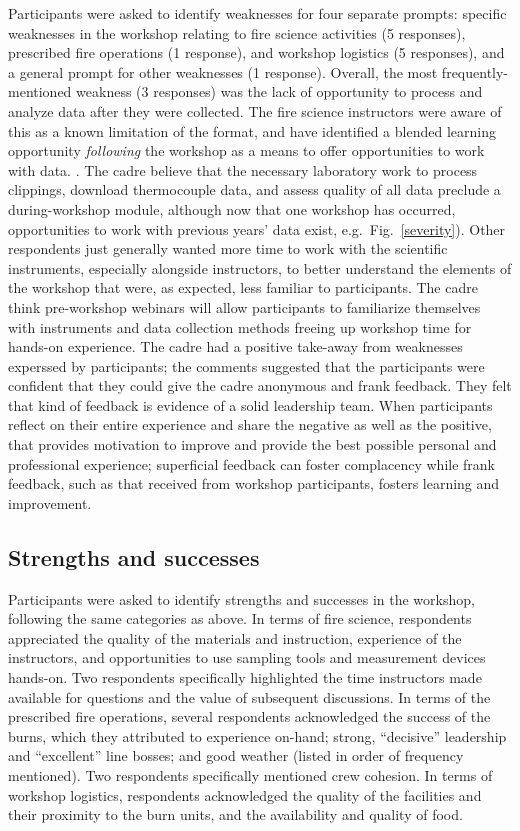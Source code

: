 \documentclass[fire,article,submit,moreauthors,pdftex]{Definitions/mdpi}
\begin{document}
Participants were asked to identify weaknesses for four separate prompts: specific weaknesses in the workshop relating to fire science activities (5 responses), prescribed fire operations (1 response), and workshop logistics (5 responses), and a general prompt for other weaknesses (1 response).
Overall, the most frequently-mentioned weakness (3 responses) was the lack of opportunity to process and analyze data after they were collected.
The fire science instructors were aware of this as a known limitation of the format, and have identified a blended learning opportunity \emph{following} the workshop as a means to offer opportunities to work with data.
. The cadre believe that the necessary laboratory work to process clippings, download thermocouple data, and assess quality of all data preclude a during-workshop module, although now that one workshop has occurred, opportunities to work with previous years' data exist, e.g.~Fig.~\ref{severity}).
Other respondents just generally wanted more time to work with the scientific instruments, especially alongside instructors, to better understand the elements of the workshop that were, as expected, less familiar to participants.
The cadre think pre-workshop webinars will allow participants to familiarize themselves with instruments and data collection methods freeing up workshop time for hands-on experience. 
The cadre had a positive take-away from weaknesses experssed by participants; the comments suggested that the participants were confident that they could give the cadre anonymous and frank feedback.
They felt that kind of feedback is evidence of a solid leadership team. 
When participants reflect on their entire experience and share the negative as well as the positive, that provides motivation to improve and provide the best possible personal and professional experience; superficial feedback can foster complacency while frank feedback, such as that received from workshop participants, fosters learning and improvement. 


\subsection{Strengths and successes}

Participants were asked to identify strengths and successes in the workshop, following the same categories as above.
In terms of fire science, respondents appreciated the quality of the materials and instruction, experience of the instructors, and opportunities to use sampling tools and measurement devices hands-on.
Two respondents specifically highlighted the time instructors made available for questions and the value of subsequent discussions.
In terms of the prescribed fire operations, several respondents acknowledged the success of the burns, which they attributed to experience on-hand; strong, ``decisive'' leadership and ``excellent'' line bosses; and good weather (listed in order of frequency mentioned).
Two respondents specifically mentioned crew cohesion.
In terms of workshop logistics, respondents acknowledged the quality of the facilities and their proximity to the burn units, and the availability and quality of food.
\end{document}
